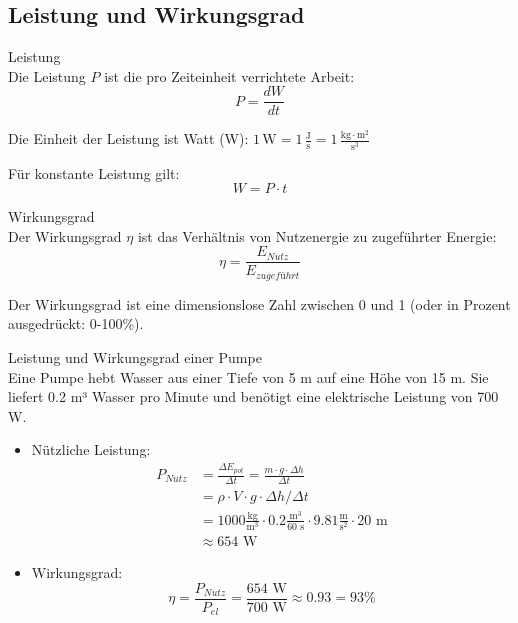 \subsection{Leistung und Wirkungsgrad}
\begin{definition}{Leistung}\\
    Die Leistung $P$ ist die pro Zeiteinheit verrichtete Arbeit:
    \begin{equation}
        P = \frac{dW}{dt}
    \end{equation}
    
    Die Einheit der Leistung ist Watt (W): $1 \, \text{W} = 1 \, \frac{\text{J}}{\text{s}} = 1 \, \frac{\text{kg} \cdot \text{m}^2}{\text{s}^3}$
    
    Für konstante Leistung gilt:
    \begin{equation}
        W = P \cdot t
    \end{equation}
\end{definition}

\begin{definition}{Wirkungsgrad}\\
    Der Wirkungsgrad $\eta$ ist das Verhältnis von Nutzenergie zu zugeführter Energie:
    \begin{equation}
        \eta = \frac{E_{Nutz}}{E_{zugeführt}}
    \end{equation}
    
    Der Wirkungsgrad ist eine dimensionslose Zahl zwischen 0 und 1 (oder in Prozent ausgedrückt: 0-100\%).
\end{definition}

\begin{example2}{Leistung und Wirkungsgrad einer Pumpe}\\
    Eine Pumpe hebt Wasser aus einer Tiefe von 5 m auf eine Höhe von 15 m. Sie liefert 0.2 m³ Wasser pro Minute und benötigt eine elektrische Leistung von 700 W.
    
    \begin{itemize}
        \item Nützliche Leistung: 
        \begin{align}
            P_{Nutz} &= \frac{\Delta E_{pot}}{\Delta t} = \frac{m \cdot g \cdot \Delta h}{\Delta t} \\
            &= \rho \cdot V \cdot g \cdot \Delta h / \Delta t \\
            &= 1000 \frac{\text{kg}}{\text{m}^3} \cdot 0.2 \frac{\text{m}^3}{60 \text{ s}} \cdot 9.81 \frac{\text{m}}{\text{s}^2} \cdot 20 \text{ m} \\
            &\approx 654 \text{ W}
        \end{align}
        
        \item Wirkungsgrad: 
        \begin{equation}
            \eta = \frac{P_{Nutz}}{P_{el}} = \frac{654 \text{ W}}{700 \text{ W}} \approx 0.93 = 93\%
        \end{equation}
    \end{itemize}
\end{example2}

